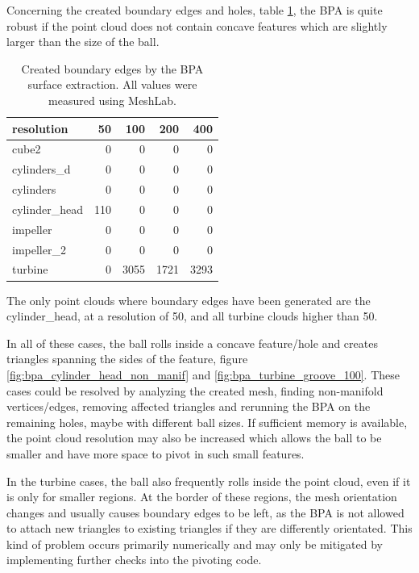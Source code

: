 Concerning the created boundary edges and holes, \cf table \ref{tbl:bpa_boundary edges}, the BPA is quite robust if the point cloud does not contain concave features which are slightly larger than the size of the ball.
%
\begin{table}
	\centering
	\begin{tabular}{l|r|r|r|r}
		resolution     &  50 &  100 &  200 &  400 \\
		\midrule
		cube2          &   0 &    0 &    0 &    0 \\
		cylinders\_d   &   0 &    0 &    0 &    0 \\
		cylinders      &   0 &    0 &    0 &    0 \\
		cylinder\_head & 110 &    0 &    0 &    0 \\
		impeller       &   0 &    0 &    0 &    0 \\
		impeller\_2    &   0 &    0 &    0 &    0 \\
		turbine        &   0 & 3055 & 1721 & 3293 \\
	\end{tabular}
	\caption{
		Created boundary edges by the BPA surface extraction.
		All values were measured using MeshLab.
	}
	\label{tbl:bpa_boundary edges}
\end{table}
%
The only point clouds where boundary edges have been generated are the cylinder\_head, at a resolution of 50, and all turbine clouds higher than 50.

In all of these cases, the ball rolls inside a concave feature/hole and creates triangles spanning the sides of the feature, \cf figure \ref{fig:bpa_cylinder_head_non_manif} and \ref{fig:bpa_turbine_groove_100}.
These cases could be resolved by analyzing the created mesh, finding non-manifold vertices/edges, removing affected triangles and rerunning the BPA on the remaining holes, maybe with different ball sizes.
If sufficient memory is available, the point cloud resolution may also be increased which allows the ball to be smaller and have more space to pivot in such small features.

In the turbine cases, the ball also frequently rolls inside the point cloud, even if it is only for smaller regions.
At the border of these regions, the mesh orientation changes and usually causes boundary edges to be left, as the BPA is not allowed to attach new triangles to existing triangles if they are differently orientated.
This kind of problem occurs primarily numerically and may only be mitigated by implementing further checks into the pivoting code.


